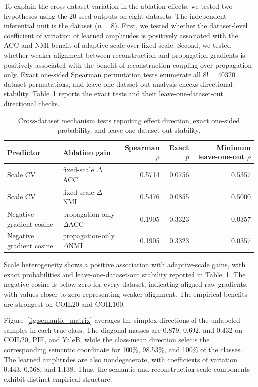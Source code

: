 \documentclass[a4paper,preprint,12pt]{elsarticle}
\newcommand{\PRtablefont}{\fontsize{10}{12}\selectfont}
\theoremstyle{remark}
\begin{document}
To explain the cross-dataset variation in the ablation effects, we tested two hypotheses using the 20-seed outputs on eight datasets. The independent inferential unit is the dataset ($n=8$). First, we tested whether the dataset-level coefficient of variation of learned amplitudes is positively associated with the ACC and NMI benefit of adaptive scale over fixed scale. Second, we tested whether weaker alignment between reconstruction and propagation gradients is positively associated with the benefit of reconstruction coupling over propagation only. Exact one-sided Spearman permutation tests enumerate all $8!=40320$ dataset permutations, and leave-one-dataset-out analysis checks directional stability. Table~\ref{tab:regime} reports the exact tests and their leave-one-dataset-out directional checks.

\begin{table}[!htbp]
\centering
\caption{Cross-dataset mechanism tests reporting effect direction, exact one-sided probability, and leave-one-dataset-out stability.}
\label{tab:regime}
\PRtablefont
\setlength{\tabcolsep}{3pt}
\begin{tabularx}{\textwidth}{XXrrr}
\toprule
Predictor & Ablation gain & Spearman $\rho$ & Exact $p$ & Minimum leave-one-out $\rho$ \\
\midrule
Scale CV & fixed-scale $\Delta$ACC & 0.5714 & 0.0756 & 0.5357 \\
Scale CV & fixed-scale $\Delta$NMI & 0.5476 & 0.0855 & 0.5000 \\
Negative gradient cosine & propagation-only $\Delta$ACC & 0.1905 & 0.3323 & 0.0357 \\
Negative gradient cosine & propagation-only $\Delta$NMI & 0.1905 & 0.3323 & 0.0357 \\
\bottomrule
\end{tabularx}
\end{table}

Scale heterogeneity shows a positive association with adaptive-scale gains, with exact probabilities and leave-one-dataset-out stability reported in Table~\ref{tab:regime}. The negative cosine is below zero for every dataset, indicating aligned raw gradients, with values closer to zero representing weaker alignment. The empirical benefits are strongest on COIL20 and COIL100.

Figure~\ref{fig:semantic_matrix} averages the simplex directions of the unlabeled samples in each true class. The diagonal masses are 0.879, 0.692, and 0.432 on COIL20, PIE, and YaleB, while the class-mean direction selects the corresponding semantic coordinate for 100\%, 98.53\%, and 100\% of the classes. The learned amplitudes are also nondegenerate, with coefficients of variation 0.443, 0.568, and 1.138. Thus, the semantic and reconstruction-scale components exhibit distinct empirical structure.
\end{document}
